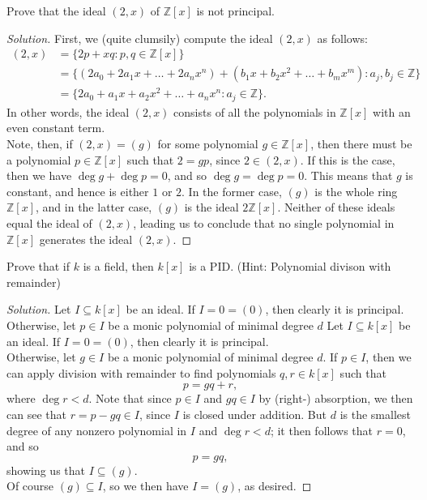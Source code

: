 \documentclass[12pt]{article}
\newenvironment{problem}[2][Problem]{\begin{trivlist}
\item[\hskip \labelsep {\bfseries #1}\hskip \labelsep {\bfseries #2.}]}{\end{trivlist}}
\newenvironment{solution}
  {\renewcommand\qedsymbol{$\blacksquare$}\begin{proof}[Solution]}
{\end{proof}}
\theoremstyle{remark}
\begin{document}
\begin{problem}{4.3}
  Prove that the ideal $(2,x)$ of $\mathbb{Z}[x]$ is not principal.
\end{problem}
\begin{solution}
  First, we (quite clumsily) compute the ideal $(2,x)$ as follows:
  \begin{align*}
    (2,x) &= \{2p+xq : p,q\in\mathbb{Z}[x]\} \\
    &= \{(2a_0+2a_1x+\dots+2a_nx^n) + (b_1x+b_2x^2+\dots+b_mx^m):a_j,b_j\in\mathbb{Z}\}\\
    &= \{2a_0+a_1x+a_2x^2+\dots+a_nx^n : a_j\in\mathbb{Z}\}.
  \end{align*}
  In other words, the ideal $(2,x)$ consists of all the polynomials in $\mathbb{Z}[x]$ with an
  even constant term.\\
  \indent Note, then, if $(2,x)=(g)$ for some polynomial $g\in\mathbb{Z}[x]$,
  then there must be a polynomial $p\in\mathbb{Z}[x]$ such that $2=gp$, since $2\in(2,x)$.
  If this is the case, then we have $\deg g + \deg p = 0$, and so $\deg g = \deg p = 0$.
  This means that $g$ is constant, and hence is either $1$ or $2$. 
  In the former case, $(g)$ is the whole ring $\mathbb{Z}[x]$, and in the latter case,
  $(g)$ is the ideal $2\mathbb{Z}[x]$.
  Neither of these ideals equal the ideal of $(2,x)$, leading us to conclude that no single
  polynomial in $\mathbb{Z}[x]$ generates the ideal $(2,x)$.
\end{solution}

\begin{problem}{4.4}
  Prove that if $k$ is a field, then $k[x]$ is a PID. (Hint: Polynomial divison with remainder)
\end{problem}
\begin{solution}
  Let $I\subseteq k[x]$ be an ideal.
  If $I = 0 = (0)$, then clearly it is principal.
  Otherwise, let $p\in I$ be a monic polynomial of minimal degree $d$
    Let $I\subseteq k[x]$ be an ideal.
    If $I = 0 = (0)$, then clearly it is principal. \\
    \indent Otherwise, let $g\in I$ be a monic polynomial of minimal degree $d$.
    If $p\in I$, then we can apply division with remainder to find polynomials $q,r\in k[x]$
    such that $$p=gq+r,$$ where $\deg r < d$.
    Note that since $p\in I$ and $gq\in I$ by (right-) absorption, we then can see that
    $r=p-gq\in I$, since $I$ is closed under addition.
    But $d$ is the smallest degree of any nonzero polynomial in $I$ and $\deg r < d$; it
    then follows that $r = 0$, and so $$p = gq,$$ showing us that $I\subseteq(g)$.
    \\\indent Of course $(g)\subseteq I$, so we then have $I=(g)$, as desired.
\end{solution}
\end{document}
